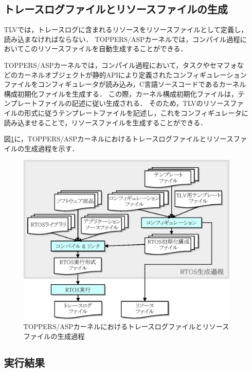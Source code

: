 \subsection{トレースログファイルとリソースファイルの生成}

TLVでは，トレースログに含まれるリソースをリソースファイルとして定義し，読み込まなければならない．
TOPPERS/ASPカーネルでは，コンパイル過程においてこのリソースファイルを自動生成することができる．

TOPPERS/ASPカーネルでは，コンパイル過程において，タスクやセマフォなどのカーネルオブジェクトが静的APIにより定義されたコンフィギュレーションファイルをコンフィギュレータが読み込み，C言語ソースコードであるカーネル構成初期化ファイルを生成する．
この際，カーネル構成初期化ファイルは，テンプレートファイルの記述に従い生成される．
そのため，TLVのリソースファイルの形式に従うテンプレートファイルを記述し，これをコンフィギュレータに読み込ませることで，リソースファイルを生成することができる．

図\ref{fig:rtosMakeProcess}に，TOPPERS/ASPカーネルにおけるトレースログファイルとリソースファイルの生成過程を示す．

\begin{figure}[tb]
\begin{center}
\includegraphics[scale=0.9]{img/rtosMakeProcess.eps}
\caption{TOPPERS/ASPカーネルにおけるトレースログファイルとリソースファイルの生成過程}
\label{fig:rtosMakeProcess}
\end{center}
\end{figure}

\subsection{実行結果}

